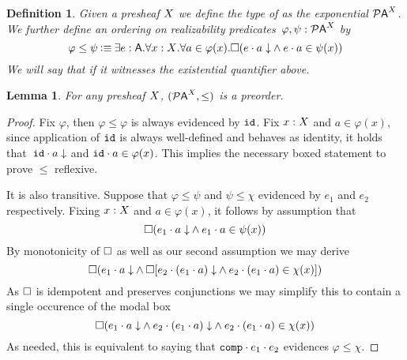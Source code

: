\documentclass[11pt]{article}
\newtheorem{lemm}[thrm]{Lemma}
\newtheorem{defn}[thrm]{Definition}
\begin{document}
\begin{defn}
  Given a presheaf \(X\) we define the type of  as the exponential \({\mathcal{P}{\mathsf{A}}}^{X} \).
  We further define an ordering on realizability
  predicates~\(\varphi, \psi : {\mathcal{P}{\mathsf{A}}}^{X}\) by
  \[
    \varphi \leq \psi
    \IsDefined
    \IExists{e : \A}{
      \IForall{x : \X}{
        \IForall{a \in \varphi(x)}{
          \IBox{(
            \IAnd%
            {\ITotal{\IAp{e}{a}}}%
            {\IAp{e}{a} \in \psi(x)}
          )}
        }
      }
    }
  \]
  We will say that  if
  it witnesses the existential quantifier above.
\end{defn}

%

\begin{lemm}
  For any presheaf \(X\), \(({\mathcal{P}{\mathsf{A}}}^{X}, \leq)\) is a preorder.
\end{lemm}
\begin{proof}
  Fix \(\varphi\), then \(\varphi \leq \varphi\) is always evidenced by
  \(\texttt{id}\).
  Fix \(x : X\) and \(a \in \varphi(x)\), since application of \(\texttt{id}\) is
  always well-defined and behaves as identity, it holds
  that~\({{\texttt{id}}\cdot{a}}\downarrow\) and \({{\texttt{id}}\cdot{a}\in\varphi(x)}\).
  This implies the necessary boxed statement to prove \(\leq\) reflexive.

  It is also transitive. Suppose that \(\varphi \leq \psi\) and
  \(\psi \leq \chi\) evidenced by \(e_{1}\) and \(e_{2}\) respectively.
  Fixing \(x : X\) and \(a \in \varphi(x)\), it follows by assumption that
  \[
    \IBox{(
      \IAnd%
      {\ITotal{\IAp{e_{1}}{a}}}%
      {\IAp{e_{1}}{a} \in \psi(x)}
    )}
  \]
  By monotonicity of \(\Box\) as well as our second assumption we may derive
  \[
    \IBox{(
      \IAnd%
      {\ITotal{\IAp{e_{1}}{a}}}%
      {\IBox{[\IAnd%
        {\ITotal{\IAp{e_{2}}{(\IAp{e_{1}}{a})}}}%
        {\IAp{e_{2}}{(\IAp{e_{1}}{a})} \in \chi(x)}
      ]}}
    )}
  \]
  As \(\Box\) is idempotent and preserves conjunctions we may simplify this
  to contain a single occurence of the modal box
  \[
    \IBox{(
      \IAnd%
      {\ITotal{\IAp{e_{1}}{a}}}%
      {\IAnd%
        {\ITotal{\IAp{e_{2}}{(\IAp{e_{1}}{a})}}}%
        {\IAp{e_{2}}{(\IAp{e_{1}}{a})} \in \chi(x)}
      }
    )}
  \]
  As needed, this is equivalent to saying that
  \({{\texttt{comp}}\cdot{e_{1}}}\cdot{e_{2}}\) evidences \(\varphi \leq \chi\).
\end{proof}
\end{document}
